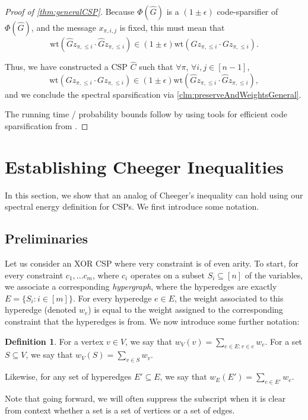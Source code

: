 \documentclass[11pt]{article}
\theoremstyle{definition}
\newtheorem{definition}{Definition}[section]
\newcommand{\eps}{\epsilon}
\newcommand{\wt}{\mathrm{wt}}
\begin{document}
\begin{proof}[Proof of \cref{thm:generalCSP}]
	Because $\Phi(\hat{G})$ is a $(1 \pm \eps)$ code-sparsifier of $\Phi(\hat{G})$, and the message $x_{\pi, i, j}$ is fixed, this must mean that 
	\[
	\wt(\hat{G}z_{\pi, \leq i} \cdot \hat{G}z_{\pi, \leq i}) \in (1 \pm \eps) \wt(Gz_{\pi, \leq i} \cdot Gz_{\pi, \leq i}).
	\]
	
	Thus, we have constructed a CSP $\hat{C}$ such that $\forall \pi$, $\forall i, j \in [n-1]$, 
	\[
	\wt(Gz_{\pi, \leq i} \cdot Gz_{\pi, \leq i}) \in (1 \pm \eps) \wt(\hat{G}z_{\pi, \leq i} \cdot \hat{G}z_{\pi, \leq i}),
	\]
	and we conclude the spectral sparsification via \cref{clm:preserveAndWeightsGeneral}.
	
	The running time / probability bounds follow by using tools for efficient code sparsification from \cite{KPS24c}. 
\end{proof}

\section{Establishing Cheeger Inequalities}\label{sec:cheeger}

In this section, we show that an analog of Cheeger's inequality can hold using our spectral energy definition for CSPs. We first introduce some notation.

\subsection{Preliminaries}

Let us consider an XOR CSP where very constraint is of even arity. To start, for every constraint $c_1, \dots c_m$, where $c_i$ operates on a subset $S_i \subseteq [n]$ of the variables, we associate a corresponding \emph{hypergraph}, where the hyperedges are exactly $E = \{S_i: i \in [m]\}$. For every hyperedge $e \in E$, the weight associated to this hyperedge (denoted $w_e$) is equal to the weight assigned to the corresponding constraint that the hyperedges is from. We now introduce some further notation:

\begin{definition}
    For a vertex $v \in V$, we say that $w_V(v) = \sum_{e \in E: v \in e} w_e$. For a set $S \subseteq V$, we say that $w_V(S) = \sum_{v \in S} w_v$.

    Likewise, for any set of hyperedges $E' \subseteq E$, we say that $w_E(E') = \sum_{e \in E'} w_e$.

    Note that going forward, we will often suppress the subscript when it is clear from context whether a set is a set of vertices or a set of edges. 
\end{definition}
\end{document}
